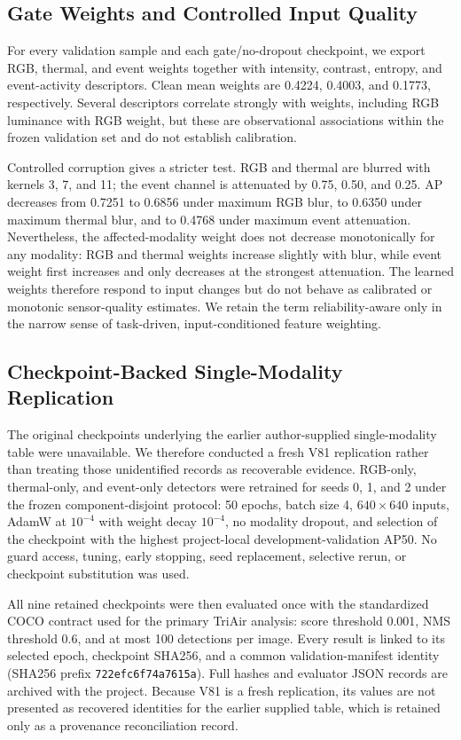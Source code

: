 \subsection{Gate Weights and Controlled Input Quality}
For every validation sample and each gate/no-dropout checkpoint, we export RGB, thermal, and event weights together with intensity, contrast, entropy, and event-activity descriptors. Clean mean weights are 0.4224, 0.4003, and 0.1773, respectively. Several descriptors correlate strongly with weights, including RGB luminance with RGB weight, but these are observational associations within the frozen validation set and do not establish calibration.

Controlled corruption gives a stricter test. RGB and thermal are blurred with kernels 3, 7, and 11; the event channel is attenuated by 0.75, 0.50, and 0.25. AP decreases from 0.7251 to 0.6856 under maximum RGB blur, to 0.6350 under maximum thermal blur, and to 0.4768 under maximum event attenuation. Nevertheless, the affected-modality weight does not decrease monotonically for any modality: RGB and thermal weights increase slightly with blur, while event weight first increases and only decreases at the strongest attenuation. The learned weights therefore respond to input changes but do not behave as calibrated or monotonic sensor-quality estimates. We retain the term reliability-aware only in the narrow sense of task-driven, input-conditioned feature weighting.

\subsection{Checkpoint-Backed Single-Modality Replication}
The original checkpoints underlying the earlier author-supplied single-modality table were unavailable. We therefore conducted a fresh V81 replication rather than treating those unidentified records as recoverable evidence. RGB-only, thermal-only, and event-only detectors were retrained for seeds 0, 1, and 2 under the frozen component-disjoint protocol: 50 epochs, batch size 4, $640\times640$ inputs, AdamW at $10^{-4}$ with weight decay $10^{-4}$, no modality dropout, and selection of the checkpoint with the highest project-local development-validation AP50. No guard access, tuning, early stopping, seed replacement, selective rerun, or checkpoint substitution was used.

All nine retained checkpoints were then evaluated once with the standardized COCO contract used for the primary TriAir analysis: score threshold 0.001, NMS threshold 0.6, and at most 100 detections per image. Every result is linked to its selected epoch, checkpoint SHA256, and a common validation-manifest identity (SHA256 prefix \texttt{722efc6f74a7615a}). Full hashes and evaluator JSON records are archived with the project. Because V81 is a fresh replication, its values are not presented as recovered identities for the earlier supplied table, which is retained only as a provenance reconciliation record.

